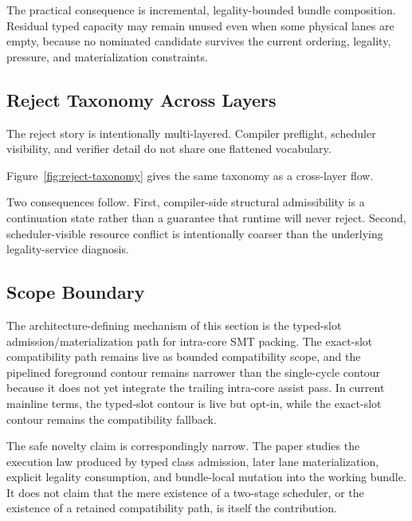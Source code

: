 \documentclass[twocolumn]{article}
\begin{document}
The practical consequence is incremental, legality-bounded bundle composition. Residual typed capacity may remain unused even when some physical lanes are empty, because no nominated candidate survives the current ordering, legality, pressure, and materialization constraints.


\subsection{Reject Taxonomy Across Layers}

The reject story is intentionally multi-layered. Compiler preflight, scheduler visibility, and verifier detail do not share one flattened vocabulary.



Figure~\ref{fig:reject-taxonomy} gives the same taxonomy as a cross-layer flow.



Two consequences follow. First, compiler-side structural admissibility is a continuation state rather than a guarantee that runtime will never reject. Second, scheduler-visible resource conflict is intentionally coarser than the underlying legality-service diagnosis.


\subsection{Scope Boundary}

The architecture-defining mechanism of this section is the typed-slot admission/materialization path for intra-core SMT packing. The exact-slot compatibility path remains live as bounded compatibility scope, and the pipelined foreground contour remains narrower than the single-cycle contour because it does not yet integrate the trailing intra-core assist pass. In current mainline terms, the typed-slot contour is live but opt-in, while the exact-slot contour remains the compatibility fallback.

The safe novelty claim is correspondingly narrow. The paper studies the execution law produced by typed class admission, later lane materialization, explicit legality consumption, and bundle-local mutation into the working bundle. It does not claim that the mere existence of a two-stage scheduler, or the existence of a retained compatibility path, is itself the contribution.
\end{document}
